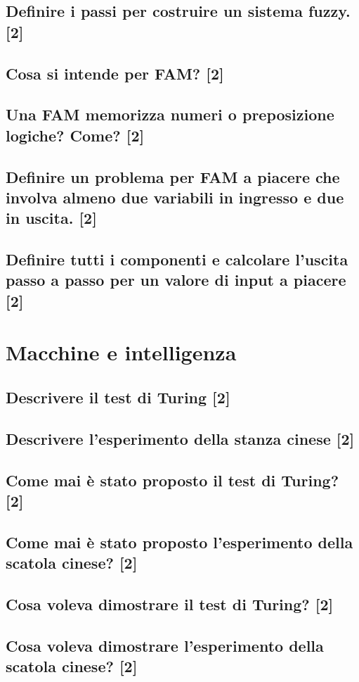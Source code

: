 \documentclass[\main/main.tex]{subfiles}
\begin{document}
\subsection{Definire i passi per costruire un sistema fuzzy. [2]}
\subsection{Cosa si intende per FAM? [2]}
\subsection{Una FAM memorizza numeri o preposizione logiche? Come? [2]}
\subsection{Definire un problema per FAM a piacere che involva almeno due variabili in ingresso e due in uscita. [2]}
\subsection{Definire tutti i componenti e calcolare l'uscita passo a passo per un valore di input a piacere [2]}

\section{Macchine e intelligenza}

\subsection{Descrivere il test di Turing [2]}
\subsection{Descrivere l'esperimento della stanza cinese [2]}
\subsection{Come mai è stato proposto il test di Turing? [2]}
\subsection{Come mai è stato proposto l'esperimento della scatola cinese? [2]}
\subsection{Cosa voleva dimostrare il test di Turing? [2]}
\subsection{Cosa voleva dimostrare l'esperimento della scatola cinese? [2]}
\end{document}
